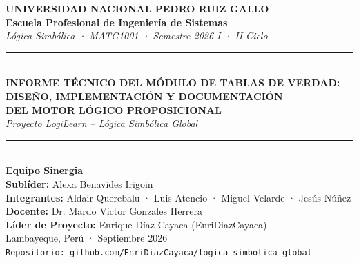 \documentclass[11pt,a4paper]{article}
\begin{document}
\begin{titlepage}
\begin{center}
  \textbf{\large UNIVERSIDAD NACIONAL PEDRO RUIZ GALLO}\\[0.2cm]
  \textbf{\normalsize Escuela Profesional de Ingeniería de Sistemas}\\[0.2cm]
  \textit{\small Lógica Simbólica · MATG1001 · Semestre 2026-I · II Ciclo}\\[1.5cm]

  \rule{\textwidth}{1.5pt}\\[0.4cm]
  {\Large \textbf{INFORME TÉCNICO DEL MÓDULO DE TABLAS DE VERDAD:}}\\[0.2cm]
  {\Large \textbf{DISEÑO, IMPLEMENTACIÓN Y DOCUMENTACIÓN}}\\[0.2cm]
  {\Large \textbf{DEL MOTOR LÓGICO PROPOSICIONAL}}\\[0.4cm]
  \textit{\large Proyecto LogiLearn -- Lógica Simbólica Global}\\[0.4cm]
  \rule{\textwidth}{1.5pt}\\[1.5cm]

  \textbf{\large Equipo Sinergia}\\[0.4cm]
  \textbf{Sublíder:} Alexa Benavides Irigoin\\[0.2cm]
  \textbf{Integrantes:} Aldair Querebalu · Luis Atencio · Miguel Velarde · Jesús Núñez\\[1.0cm]

  \textbf{Docente:} Dr. Mardo Victor Gonzales Herrera\\[0.2cm]
  \textbf{Líder de Proyecto:} Enrique Díaz Cayaca (EnriDiazCayaca)\\[1.5cm]

  \vfill
  Lambayeque, Perú · Septiembre 2026\\[0.2cm]
  \small\texttt{Repositorio: github.com/EnriDiazCayaca/logica\_simbolica\_global}
\end{center}
\end{titlepage}
\end{document}
